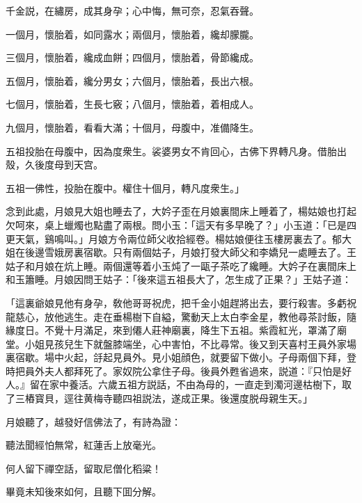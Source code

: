 \begin{myquote}
千金説，在繡房，成其身孕；心中悔，無可奈，忍氣吞聲。

一個月，懷胎着，如同露水；兩個月，懷胎着，纔却朦朧。

三個月，懷胎着，纔成血餅；四個月，懷胎着，骨節纔成。

五個月，懷胎着，纔分男女；六個月，懷胎着，長出六根。

七個月，懷胎着，生長七竅；八個月，懷胎着，着相成人。

九個月，懷胎着，看看大滿；十個月，母腹中，准備降生。

五祖投胎在母腹中，因為度衆生。裟婆男女不肯回心，古佛下界轉凡身。借胎出殼，久後度母到天宫。

\hspace*{4em}

五祖一佛性，投胎在腹中。權住十個月，轉凡度衆生。」
\end{myquote}

念到此處，月娘見大姐也睡去了，大妗子歪在月娘裏間床上睡着了，楊姑娘也打起欠呵來，桌上蠟燭也點盡了兩根。問小玉：「這天有多早晚了？」小玉道：「已是四更天氣，鷄鳴叫。」月娘方令兩位師父收拾經卷。楊姑娘便往玉樓房裏去了。郁大姐在後邊雪娥房裏宿歇。只有兩個姑子，月娘打發大師父和李嬌兒一處睡去了。王姑子和月娘在炕上睡。兩個還等着小玉炖了一甌子茶吃了纔睡。大妗子在裏間床上和玉簫睡。月娘因問王姑子：「後來這五祖長大了，怎生成了正果？」王姑子道：

「這裏爺娘見他有身孕，敎他哥哥祝虎，把千金小姐趕將出去，要行殺害。多虧祝龍慈心，放他逃生。走在垂楊樹下自縊，驚動天上太白李金星，教他尋茶討飯，隨緣度日。不覺十月滿足，來到僊人莊神廟裏，降生下五祖。紫霞紅光，罩滿了廟堂。小姐見孩兒生下就盤膝端坐，心中害怕，不比尋常。後又到天喜村王員外家場裏宿歇。場中火起，㧱起見員外。見小姐顔色，就要留下做小。子母兩個下拜，登時把員外夫人都拜死了。家奴院公拿住子母。後員外甦省過來，説道：『只怕是好人。』留在家中養活。六歲五祖方説話，不由為母的，一直走到濁河邊枯樹下，取了三樁寳貝，逕往黄梅寺聽四祖説法，遂成正果。後還度脱母親生天。」

月娘聽了，越發好信佛法了，有詩為證：

\begin{myquote}
聽法聞經怕無常，紅蓮舌上放毫光。

何人留下禪空話，留取尼僧化稻粱！
\end{myquote}

畢竟未知後來如何，且聽下囬分解。

